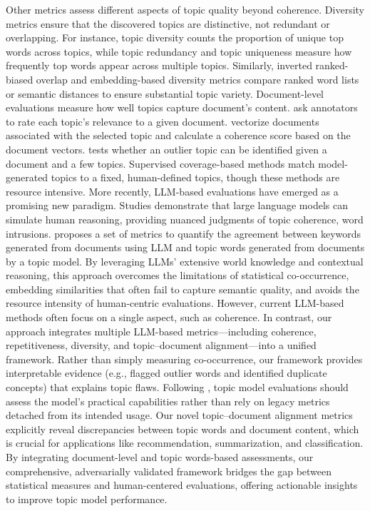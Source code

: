 Other metrics assess different aspects of topic quality beyond coherence. Diversity metrics ensure that the discovered topics are distinctive, not redundant or overlapping. For instance, topic diversity \cite{dieng2020ETM} 
counts the proportion of unique top words across topics, while topic redundancy \cite{Burkhardt2019TopicRedundancy} 
and topic uniqueness \cite{nan2019TopicUniqueness} 
measure how frequently top words appear across multiple topics. Similarly, inverted ranked-biased overlap \cite{bianchi2021CombinedTM} 
and embedding-based diversity metrics \cite{bianchi2021EmbedingCentroidTD, Terragni2021EmbedingTD} 
compare ranked word lists or semantic distances to ensure substantial topic variety. 
Document-level evaluations measure how well topics capture document's content. \cite{bhatia2017DocumentTopicEval} 
ask annotators to rate each topic’s relevance to a given document.
\cite{Korencic2018DocumenCoherence} vectorize documents associated with the selected topic and calculate a coherence score based on the document vectors.
\cite{bhatia2018topicIntrusionEval} 
tests whether an outlier topic can be identified given a document and a few topics.
Supervised coverage-based methods 
\cite{korenvcic2021CoverageEval}
match model-generated topics to a fixed, human-defined topics, though these methods are resource intensive.
More recently, LLM-based evaluations have emerged as a promising new paradigm. Studies \cite{stammbach2023revisitingLLM, rahimi2024contextualizedCoherence}
demonstrate that large language models can simulate human reasoning, providing nuanced judgments of topic coherence, word intrusions. 
\cite{yang2024llm} proposes a set of metrics to quantify the agreement between keywords generated from documents using LLM and topic words generated from documents by a topic model.
By leveraging LLMs’ extensive world knowledge and contextual reasoning, this approach overcomes the limitations of statistical co-occurrence, embedding similarities that often fail to capture semantic quality, and avoids the resource intensity of human-centric evaluations.
However, current LLM-based methods often focus on a single aspect, such as coherence. In contrast, our approach integrates multiple LLM-based metrics—including coherence, repetitiveness, diversity, and topic–document alignment—into a unified framework. Rather than simply measuring co-occurrence, our framework provides interpretable evidence (e.g., flagged outlier words and identified duplicate concepts) that explains topic flaws. Following \cite{chang2009HumanTeaLeaves, Blei2012PLDA}, topic model evaluations should assess the model's practical capabilities rather than rely on legacy metrics detached from its intended usage. Our novel topic–document alignment metrics explicitly reveal discrepancies between topic words and document content, which is crucial for applications like recommendation, summarization, and classification.
By integrating document-level and topic words-based assessments, our comprehensive, adversarially validated framework bridges the gap between statistical measures and human-centered evaluations, offering actionable insights to improve topic model performance.